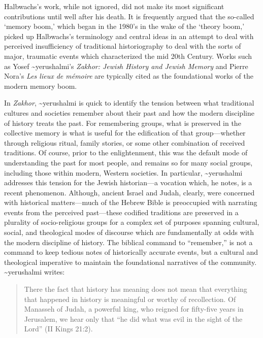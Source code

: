 Halbwachs's work, while not ignored, did not make its most significant
contributions until well after his death. It is frequently argued that
the so-called `memory boom,' which began in the 1980's in the wake of
the `theory boom,' picked up Halbwachs's terminology and central ideas
in an attempt to deal with perceived insufficiency of traditional
historiography to deal with the sorts of major, traumatic events which
characterized the mid 20th
Century.\autocites[1--2]{galinsky_galinsky2016}[See also][29--36. One
cannot help but speculate that---at least in the English-speaking
world---the translation of \emph{The Collective Memory} in 1980
contributed to the popularity of Halbwachs's
terminology.]{olick_olick-etal2011} Works such as Yosef
\textasciitilde{}yerushalmi's \emph{Zakhor: Jewish History and Jewish
Memory} and Pierre Nora's \emph{Les lieux de mémoire} are typically
cited as the foundational works of the modern memory
boom.\autocites[112--113]{klein2011}{yerushalmi1989}

In \emph{Zakhor}, \textasciitilde{}yerushalmi is quick to identify the
tension between what traditional cultures and societies remember about
their past and how the modern discipline of history treats the past. For
remembering groups, what is preserved in the collective memory is what
is useful for the edification of that group---whether through religious
ritual, family stories, or some other combination of received
traditions. Of course, prior to the enlightenment, this was the default
mode of understanding the past for most people, and remains so for many
social groups, including those within modern, Western societies. In
particular, \textasciitilde{}yerushalmi addresses this tension for the
Jewish historian---a vocation which, he notes, is a recent phenomenon.
Although, ancient Israel and Judah, clearly, were concerned with
historical matters---much of the Hebrew Bible is preoccupied with
narrating events from the perceived past---these codified traditions are
preserved in a plurality of socio-religious groups for a complex set of
purposes spanning cultural, social, and theological modes of discourse
which are fundamentally at odds with the modern discipline of history.
The biblical command to ``remember,'' is not a command to keep tedious
notes of historically accurate events, but a cultural and theological
imperative to maintain the foundational narratives of the community.
\textasciitilde{}yerushalmi writes:

\begin{quote}
There the fact that history has meaning does not mean that everything
that happened in history is meaningful or worthy of recollection. Of
Manasseh of Judah, a powerful king, who reigned for fifty-five years in
Jerusalem, we hear only that ``he did what was evil in the sight of the
Lord'' (II Kings 21:2).\autocite[10]{yerushalmi1989}
\end{quote}

